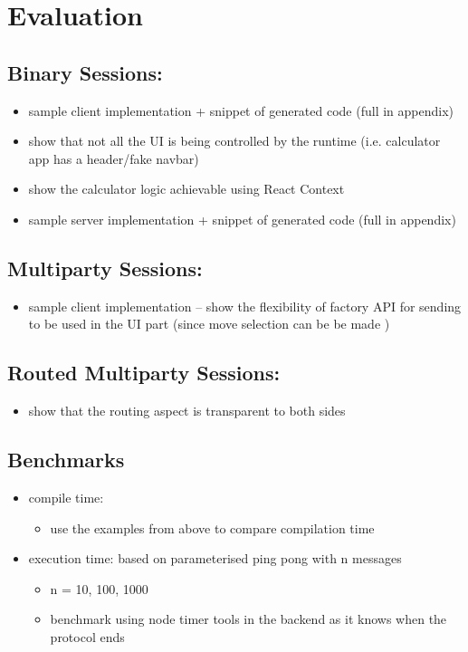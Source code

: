 \chapter{Evaluation}
\label{chap:eval}

\section{Binary Sessions: }
\begin{itemize}
\item sample client implementation + snippet of generated code (full in appendix)
\item show that not all the UI is being controlled by the runtime (i.e. calculator app has a header/fake navbar)
\item show the calculator logic achievable using React Context
\item sample server implementation + snippet of generated code (full in appendix)
\end{itemize}

\section{Multiparty Sessions: }
\begin{itemize}
\item sample client implementation -- show the flexibility of factory API for sending to be used in the UI part (since move selection can be be made )
\end{itemize}

\section{Routed Multiparty Sessions: }
\begin{itemize}
\item show that the routing aspect is transparent to both sides
\end{itemize}

\section{Benchmarks}
\begin{itemize}
\item compile time: \begin{itemize}
\item use the examples from above to compare compilation time
\end{itemize}
\item execution time: based on parameterised ping pong with n messages
\begin{itemize}
\item n = 10, 100, 1000
\item benchmark using node timer tools in the backend as it knows when the protocol ends
\end{itemize}
\end{itemize}

